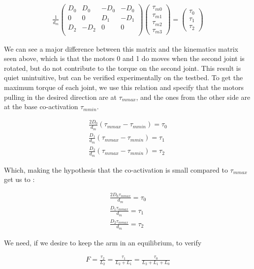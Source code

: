\documentclass{article}
\begin{document}
\begin{align}
\frac{1}{d_{m}}
\begin{pmatrix}
D_{0} & D_{0} & -D_{0} & -D_{0}\\
0 & 0 & D_{1} & -D_{1}\\
D_{2} & -D_{2} & 0 & 0\\
\end{pmatrix}
\begin{pmatrix}
\tau_{m0} \\
\tau_{m1} \\
\tau_{m2} \\
\tau_{m3}
\end{pmatrix}
=\begin{pmatrix}
\tau_{0} \\
\tau_{1} \\
\tau_{2}
\end{pmatrix}
\end{align}

We can see a major difference between this matrix and the kinematics matrix seen above, which is that the motors 0 and 1 do moves when the second joint is rotated, but do not contribute to the torque on the second joint. This result is quiet unintuitive, but can be verified experimentally on the testbed.
To get the maximum torque of each joint, we use this relation and specify that the motors pulling in the desired direction are at $\tau_{mmax}$, and the ones from the other side are at the base co-activation $\tau_{mmin}$.


\begin{align}
\frac{2D_0}{d_m}(\tau_{mmax}-\tau_{mmin}) = \tau_{0} \\
\frac{D_1}{d_m}(\tau_{mmax}-\tau_{mmin}) = \tau_{1} \\
\frac{D_2}{d_m}(\tau_{mmax}-\tau_{mmin}) = \tau_{2}
\end{align}

Which, making the hypothesis that the co-activation is small compared to $\tau_{mmax}$ get us to :

\begin{align}
\frac{2D_0\tau_{mmax}}{d_m} = \tau_{0} \\
\frac{D_1\tau_{mmax}}{d_m} = \tau_{1} \\
\frac{D_2\tau_{mmax}}{d_m} = \tau_{2}
\end{align}


We need, if we desire to keep the arm in an equilibrium, to verify 

\begin{align}
F = \frac{\tau_{2}}{L_{2}} = \frac{\tau_{1}}{L_{2}+L_{1}} = \frac{\tau_{0}}{L_{2}+L_{1}+L_{0}}
\end{align}
\end{document}
